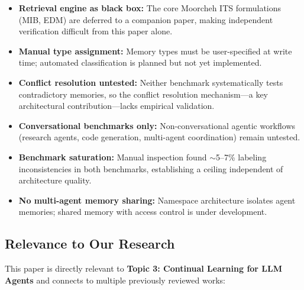 \documentclass[11pt]{article}
\begin{document}
\begin{itemize}
    \item \textbf{Retrieval engine as black box:} The core Moorcheh ITS formulations (MIB, EDM) are deferred to a companion paper, making independent verification difficult from this paper alone.
    \item \textbf{Manual type assignment:} Memory types must be user-specified at write time; automated classification is planned but not yet implemented.
    \item \textbf{Conflict resolution untested:} Neither benchmark systematically tests contradictory memories, so the conflict resolution mechanism---a key architectural contribution---lacks empirical validation.
    \item \textbf{Conversational benchmarks only:} Non-conversational agentic workflows (research agents, code generation, multi-agent coordination) remain untested.
    \item \textbf{Benchmark saturation:} Manual inspection found $\sim$5--7\% labeling inconsistencies in both benchmarks, establishing a ceiling independent of architecture quality.
    \item \textbf{No multi-agent memory sharing:} Namespace architecture isolates agent memories; shared memory with access control is under development.
\end{itemize}

\subsection{Relevance to Our Research}

This paper is directly relevant to \textbf{Topic 3: Continual Learning for LLM Agents} and connects to multiple previously reviewed works:
\end{document}
